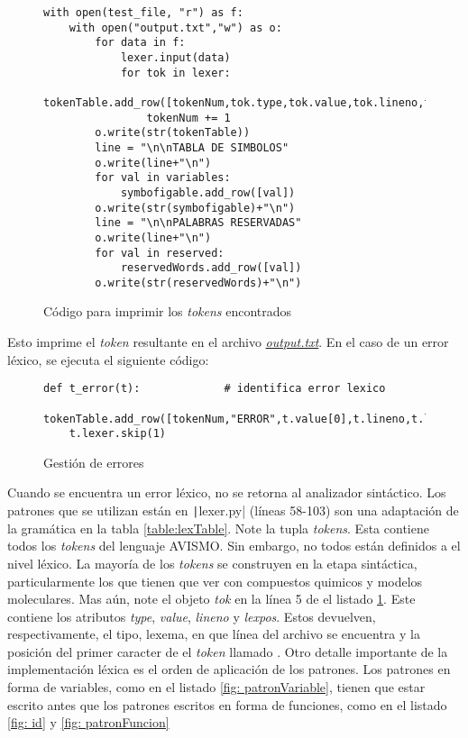\begin{figure}[H]
    \begin{verbatim}
with open(test_file, "r") as f:
    with open("output.txt","w") as o:
        for data in f:
            lexer.input(data)
            for tok in lexer:
                tokenTable.add_row([tokenNum,tok.type,tok.value,tok.lineno,tok.lexpos,test_file])
                tokenNum += 1
        o.write(str(tokenTable))
        line = "\n\nTABLA DE SIMBOLOS"
        o.write(line+"\n")
        for val in variables:
            symbofigable.add_row([val])
        o.write(str(symbofigable)+"\n")
        line = "\n\nPALABRAS RESERVADAS"
        o.write(line+"\n")
        for val in reserved:
            reservedWords.add_row([val])
        o.write(str(reservedWords)+"\n")
\end{verbatim}
    \caption{Código para imprimir los \textit{tokens} encontrados}
    \label{fig: scanner}
\end{figure}
Esto imprime el \textit{token} resultante en el archivo \href{https://github.com/aramis-matos/comp4999_compilers_project/blob/master/code/python_remake/output.txt}{\textit{output.txt}}. En el caso de un error léxico, se ejecuta el siguiente código:
\begin{figure}
\begin{verbatim}
def t_error(t):             # identifica error lexico
    tokenTable.add_row([tokenNum,"ERROR",t.value[0],t.lineno,t.lexpos,test_file])
    t.lexer.skip(1)
\end{verbatim}
\caption{Gestión de errores}
\label{fig: errores}
\end{figure}
Cuando se encuentra un error léxico, no se retorna al analizador sintáctico. Los patrones que se utilizan están en \texttt|lexer.py| (líneas 58-103) son una adaptación de la gramática en la tabla \ref{table:lexTable}. Note la tupla \textit{tokens}.
Esta contiene todos los \textit{tokens} del lenguaje AVISMO. Sin embargo, no todos están definidos a el nivel léxico. La mayoría de los \textit{tokens} se construyen en la etapa sintáctica, particularmente los que tienen que ver con compuestos quimicos y modelos moleculares.
Mas aún, note el objeto \textit{tok} en la línea 5 de el listado \ref{fig: scanner}.
Este contiene los atributos \textit{type}, \textit{value}, \textit{lineno} y \textit{lexpos}.
Estos devuelven, respectivamente, el tipo, lexema, en que línea del archivo se encuentra y la posición del primer caracter de el \textit{token} llamado . 
Otro detalle importante de la implementación léxica es el orden de aplicación de los patrones. 
Los patrones en forma de variables, como en el listado \ref{fig: patronVariable}, tienen que estar escrito antes que los patrones escritos en forma de funciones, como en el listado \ref{fig: id} y \ref{fig: patronFuncion}

